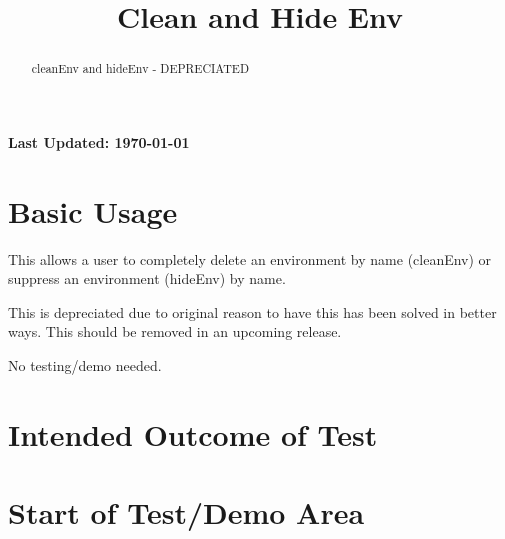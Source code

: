 \documentclass{ximera}
\title{Clean and Hide Env}
\begin{document}
\begin{abstract}
    cleanEnv and hideEnv - DEPRECIATED
\end{abstract}
\maketitle

{{\Huge \bfseries Last Updated: \today}} \\


\section{Basic Usage}

This allows a user to completely delete an environment by name (cleanEnv) or suppress an environment (hideEnv) by name.

This is depreciated due to original reason to have this has been solved in better ways. This should be removed in an upcoming release.

No testing/demo needed.


\section{Intended Outcome of Test}

\section{Start of Test/Demo Area}


\hrulefill
\end{document}
